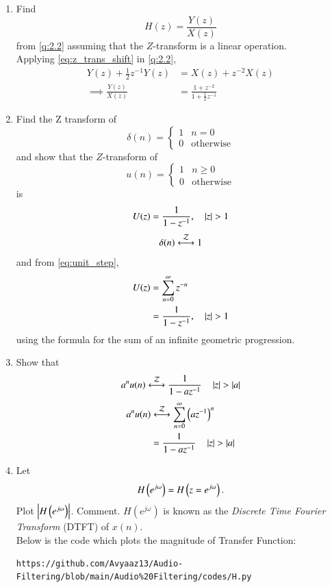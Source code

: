 \documentclass[journal,12pt,twocolumn]{IEEEtran}
\theoremstyle{remark}
\renewcommand\thesection{\arabic{section}}
\numberwithin{equation}{subsection}
\begin{document}
\begin{enumerate}[label=\thesection.\arabic*]
\item Find
%
\begin{equation}
H(z) = \frac{Y(z)}{X(z)}
\end{equation}
from  \eqref{q:2.2} assuming that the $Z$-transform is a linear operation.
\\
\solution  Applying \eqref{eq:z_trans_shift} in \eqref{q:2.2},
\begin{align}
Y(z) + \frac{1}{2}z^{-1}Y(z) &= X(z)+z^{-2}X(z)
\\
\implies \frac{Y(z)}{X(z)} &= \frac{1 + z^{-2}}{1 + \frac{1}{2}z^{-1}}
\label{eq:freq_resp}
\end{align}
%
\item Find the Z transform of 
\begin{equation}
\delta(n)
=
\begin{cases}
1 & n = 0
\\
0 & \text{otherwise}
\end{cases}
\end{equation}
and show that the $Z$-transform of
\begin{equation}
\label{eq:unit_step}
u(n)
=
\begin{cases}
1 & n \ge 0
\\
0 & \text{otherwise}
\end{cases}
\end{equation}
is
\begin{equation}
U(z) = \frac{1}{1-z^{-1}}, \quad \left\vert z\right\vert > 1
\end{equation}
\solution
\begin{equation}
\delta(n) \system{Z} 1
\end{equation}
and from \eqref{eq:unit_step},
\begin{align}
U(z) &= \sum _{n= 0}^{\infty}z^{-n}
\\
&=\frac{1}{1-z^{-1}}, \quad \left\vert z\right\vert > 1
\end{align}
using the formula for the sum of an infinite geometric progression.
%
\item Show that 
\begin{equation}
\label{eq:anun}
a^nu(n) \system{Z} \frac{1}{1-az^{-1}} \quad \abs{z} > \abs{a}
\end{equation}
\solution 
\begin{align}
	a^nu(n) &\system{Z} \sum_{n = 0}^{\infty}\brak{az^{-1}}^n \\
			&= \frac{1}{1-az^{-1}} \quad \abs{z} > \abs{a}
\end{align}
%
\item 
Let
\begin{equation}
	H\left(e^{j \omega}\right) = H\left(z = e^{j \omega}\right).
\end{equation}
Plot $\left\vert H\left(e^{j \omega}\right)\right\vert$.  Comment.  $H(e^{j \omega})$ is
known as the {\em Discrete Time Fourier Transform} (DTFT) of $x(n)$.
\\
\solution Below is the code which plots the magnitude of Transfer Function:
\begin{lstlisting}
https://github.com/Avyaaz13/Audio-Filtering/blob/main/Audio%20Filtering/codes/H.py
\end{lstlisting}



\end{enumerate}
\end{document}
